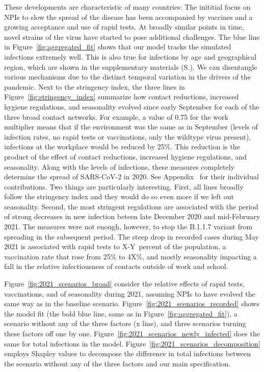 These developments are characteristic of many countries: The inititial focus on NPIs to slow the spread of the disease has been accompanied by vaccines and a growing acceptance and use of rapid tests. At broadly similar points in time, novel strains of the virus have started to pose additional challenges. The blue line in Figure~\ref{fig:aggregated_fit} shows that our model tracks the simulated infections extremely well. This is also true for infections by age and geographical region, which are shown in the supplementary materials (S.). We can disentangle various mechanisms due to the distinct temporal variation in the drivers of the pandemic. Next to the stringency index, the three lines in Figure~\ref{fig:stringency_index} summarize how contact reductions, increased hygiene regulations, and seasonality evolved since early September for each of the three broad contact networks. For example, a value of 0.75 for the work multiplier means that if the environment was the same as in September (levels of infection rates, no rapid tests or vaccinations, only the wildtype virus present), infections at the workplace would be reduced by 25\%. This reduction is the product of the effect of contact reductions, increased hygiene regulations, and seasonality. Along with the levels of infections, these measures completely determine the spread of SARS-CoV-2 in 2020. See Appendix~ for their individual contributions. Two things are particularly interesting. First, all lines broadly follow the stringency index and they would do so even more if we left out seasonality. Second, the most stringent regulations are associated with the period of strong decreases in new infection beteen late December 2020 and mid-February 2021. The measures were not enough, however, to stop the B.1.1.7 variant from spreading in the subsequent period. The steep drop in recorded cases during May 2021 is associated with rapid tests to X-Y~percent of the population, a vaccination rate that rose from 25\% to 4X\%, and mostly seasonality impacting a fall in the relative infectiousness of contacts outside of work and school.

Figure~\ref{fig:2021_scenarios_broad} consider the relative effects of rapid tests, vaccinations, and of seasonality during 2021, assuming NPIs to have evolved the same way as in the baseline scenario. Figure~\ref{fig:2021_scenarios_recorded} shows the model fit (the bold blue line, same as in Figure~\ref{fig:aggregated_fit}), a scenario without any of the three factors (x line), and three scenarios turning these factors off one by one. Figure~\ref{fig:2021_scenarios_newly_infected} does the same for total infections in the model. Figure~\ref{fig:2021_scenarios_decomposition} employs Shapley values to decompose the difference in total infections between the scenario without any of the three factors and our main specification.

